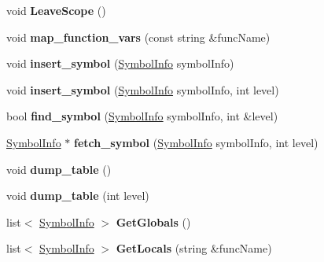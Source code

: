 \begin{DoxyCompactItemize}
\item 
\hypertarget{classSymTab_afd2c44208cdad3ddfc85136136cd27c3}{void {\bfseries Leave\-Scope} ()}\label{classSymTab_afd2c44208cdad3ddfc85136136cd27c3}

\item 
\hypertarget{classSymTab_aaca51de0935bbdbf3fdf434deccccb92}{void {\bfseries map\-\_\-function\-\_\-vars} (const string \&func\-Name)}\label{classSymTab_aaca51de0935bbdbf3fdf434deccccb92}

\item 
\hypertarget{classSymTab_ad8e59e29c50f039570c5844871bf838c}{void {\bfseries insert\-\_\-symbol} (\hyperlink{structSymbolInfo}{Symbol\-Info} symbol\-Info)}\label{classSymTab_ad8e59e29c50f039570c5844871bf838c}

\item 
\hypertarget{classSymTab_a8372047f573c6d84fa231aa7e9842280}{void {\bfseries insert\-\_\-symbol} (\hyperlink{structSymbolInfo}{Symbol\-Info} symbol\-Info, int level)}\label{classSymTab_a8372047f573c6d84fa231aa7e9842280}

\item 
\hypertarget{classSymTab_a2aedd91e00780c889e60a60fc0795daf}{bool {\bfseries find\-\_\-symbol} (\hyperlink{structSymbolInfo}{Symbol\-Info} symbol\-Info, int \&level)}\label{classSymTab_a2aedd91e00780c889e60a60fc0795daf}

\item 
\hypertarget{classSymTab_ac0bfd9c56cfd8e697046178629adbebc}{\hyperlink{structSymbolInfo}{Symbol\-Info} $\ast$ {\bfseries fetch\-\_\-symbol} (\hyperlink{structSymbolInfo}{Symbol\-Info} symbol\-Info, int level)}\label{classSymTab_ac0bfd9c56cfd8e697046178629adbebc}

\item 
\hypertarget{classSymTab_ab4c005eb114053be22fdbe315542f55b}{void {\bfseries dump\-\_\-table} ()}\label{classSymTab_ab4c005eb114053be22fdbe315542f55b}

\item 
\hypertarget{classSymTab_ad5d45136f341bf024a226fe600fb4dcc}{void {\bfseries dump\-\_\-table} (int level)}\label{classSymTab_ad5d45136f341bf024a226fe600fb4dcc}

\item 
\hypertarget{classSymTab_aced837e720830dd9ccb2d3dde621d489}{list$<$ \hyperlink{structSymbolInfo}{Symbol\-Info} $>$ {\bfseries Get\-Globals} ()}\label{classSymTab_aced837e720830dd9ccb2d3dde621d489}

\item 
\hypertarget{classSymTab_a76b5a70170535019b1fe58fa25a9998c}{list$<$ \hyperlink{structSymbolInfo}{Symbol\-Info} $>$ {\bfseries Get\-Locals} (string \&func\-Name)}\label{classSymTab_a76b5a70170535019b1fe58fa25a9998c}


\end{DoxyCompactItemize}
